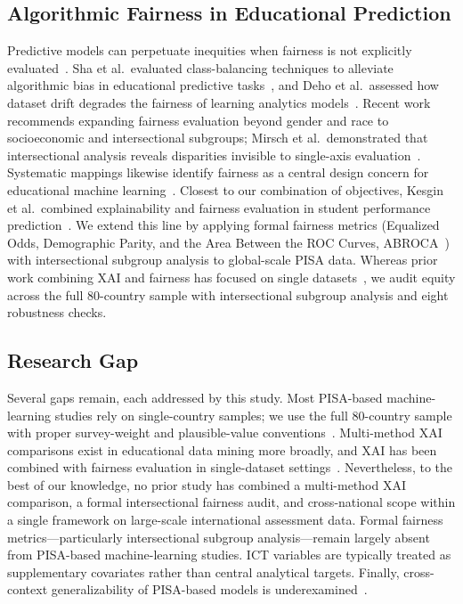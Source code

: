 \documentclass[journal]{IEEEtran}
\begin{document}
\subsection{Algorithmic Fairness in Educational Prediction}
Predictive models can perpetuate inequities when fairness is not explicitly evaluated~\cite{Baker_Hawn_2022,Kizilcec_Lee_2022}. Sha et al.\ evaluated class-balancing techniques to alleviate algorithmic bias in educational predictive tasks~\cite{sha2022balancing}, and Deho et al.\ assessed how dataset drift degrades the fairness of learning analytics models~\cite{deho2024drift}. Recent work recommends expanding fairness evaluation beyond gender and race to socioeconomic and intersectional subgroups; Mirsch et al.\ demonstrated that intersectional analysis reveals disparities invisible to single-axis evaluation~\cite{Mirsch_2025_intersectional}. Systematic mappings likewise identify fairness as a central design concern for educational machine learning~\cite{pham2025fairness}. Closest to our combination of objectives, Kesgin et al.\ combined explainability and fairness evaluation in student performance prediction~\cite{appl2025fairness}. We extend this line by applying formal fairness metrics (Equalized Odds, Demographic Parity, and the Area Between the ROC Curves, ABROCA~\cite{gardner2019slicing}) with intersectional subgroup analysis to global-scale PISA data. Whereas prior work combining XAI and fairness has focused on single datasets~\cite{appl2025fairness}, we audit equity across the full 80-country sample with intersectional subgroup analysis and eight robustness checks.

\subsection{Research Gap}
Several gaps remain, each addressed by this study. Most PISA-based machine-learning studies rely on single-country samples; we use the full 80-country sample with proper survey-weight and plausible-value conventions~\cite{Rutkowski_2010,OECD_2022_technical}. Multi-method XAI comparisons exist in educational data mining more broadly, and XAI has been combined with fairness evaluation in single-dataset settings~\cite{appl2025fairness}. Nevertheless, to the best of our knowledge, no prior study has combined a multi-method XAI comparison, a formal intersectional fairness audit, and cross-national scope within a single framework on large-scale international assessment data. Formal fairness metrics---particularly intersectional subgroup analysis---remain largely absent from PISA-based machine-learning studies. ICT variables are typically treated as supplementary covariates rather than central analytical targets. Finally, cross-context generalizability of PISA-based models is underexamined~\cite{kleter2024boundary}.
\end{document}
